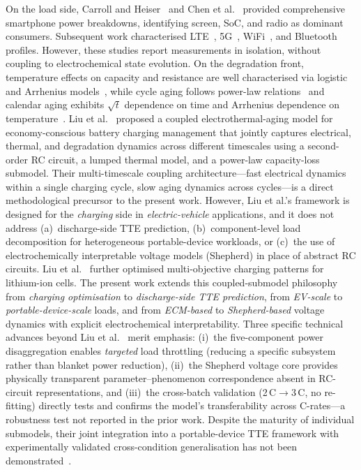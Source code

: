 \documentclass[5p,times,number]{elsarticle}
\begin{document}
On the load side, Carroll and Heiser~\cite{Carroll2010} and Chen et al.~\cite{Chen2014} provided comprehensive smartphone power breakdowns, identifying screen, SoC, and radio as dominant consumers.
Subsequent work characterised LTE~\cite{Lauridsen2014}, 5G~\cite{Xu2020}, WiFi~\cite{Sun2018}, and Bluetooth~\cite{Negri2006} profiles.
However, these studies report measurements in isolation, without coupling to electrochemical state evolution.
On the degradation front, temperature effects on capacity and resistance are well characterised via logistic and Arrhenius models~\cite{Ali2020,Chen2025,He2017,Whittingham2012,Tang2019ECM}, while cycle aging follows power-law relations~\cite{Vetter2005,Wang2011JPS,Kou2017,Li2019} and calendar aging exhibits $\sqrt{t}$ dependence on time and Arrhenius dependence on temperature~\cite{Vetter2005,Schmalstieg2014JPS}.
Liu et al.~\cite{Liu2019ECM} proposed a coupled electrothermal-aging model for economy-conscious battery charging management that jointly captures electrical, thermal, and degradation dynamics across different timescales using a second-order RC circuit, a lumped thermal model, and a power-law capacity-loss submodel.
Their multi-timescale coupling architecture---fast electrical dynamics within a single charging cycle, slow aging dynamics across cycles---is a direct methodological precursor to the present work.
However, Liu et al.'s framework is designed for the \emph{charging} side in \emph{electric-vehicle} applications, and it does not address (a)~discharge-side TTE prediction, (b)~component-level load decomposition for heterogeneous portable-device workloads, or (c)~the use of electrochemically interpretable voltage models (Shepherd) in place of abstract RC circuits.
Liu et al.~\cite{Liu2018ECM} further optimised multi-objective charging patterns for lithium-ion cells.
The present work extends this coupled-submodel philosophy from \emph{charging optimisation} to \emph{discharge-side TTE prediction}, from \emph{EV-scale} to \emph{portable-device-scale} loads, and from \emph{ECM-based} to \emph{Shepherd-based} voltage dynamics with explicit electrochemical interpretability.
Three specific technical advances beyond Liu et al.~\cite{Liu2019ECM} merit emphasis: (i)~the five-component power disaggregation enables \emph{targeted} load throttling (reducing a specific subsystem rather than blanket power reduction), (ii)~the Shepherd voltage core provides physically transparent parameter--phenomenon correspondence absent in RC-circuit representations, and (iii)~the cross-batch validation (2\,C$\to$3\,C, no re-fitting) directly tests and confirms the model's transferability across C-rates---a robustness test not reported in the prior work.
Despite the maturity of individual submodels, their joint integration into a portable-device TTE framework with experimentally validated cross-condition generalisation has not been demonstrated~\cite{Tian2019,Xiong2018,Mama2025,Yu2025}.
\end{document}
